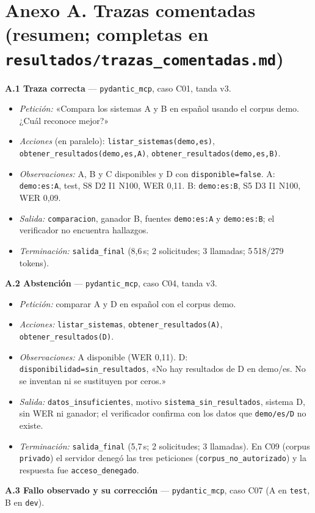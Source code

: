 \documentclass[10pt,a4paper]{article}
\newcommand{\cod}[1]{\texttt{\small #1}}
\begin{document}



\appendix
\section*{Anexo A. Trazas comentadas (resumen; completas en \texttt{resultados/trazas\_comentadas.md})}
\footnotesize
\textbf{A.1 Traza correcta} --- \cod{pydantic\_mcp}, caso C01, tanda v3.
\begin{itemize}
\item \emph{Petición:} «Compara los sistemas A y B en español usando el corpus demo. ¿Cuál reconoce mejor?»
\item \emph{Acciones} (en paralelo): \cod{listar\_sistemas(demo,es)}, \cod{obtener\_resultados(demo,es,A)}, \cod{obtener\_resultados(demo,es,B)}.
\item \emph{Observaciones:} A, B y C disponibles y D con \cod{disponible=false}. A: \cod{demo:es:A}, test, S8 D2 I1 N100, WER 0,11. B: \cod{demo:es:B}, S5 D3 I1 N100, WER 0,09.
\item \emph{Salida:} \cod{comparacion}, ganador B, fuentes \cod{demo:es:A} y \cod{demo:es:B}; el verificador no encuentra hallazgos.
\item \emph{Terminación:} \cod{salida\_final} (8,6\,s; 2 solicitudes; 3 llamadas; 5\,518/279 tokens).
\end{itemize}
\textbf{A.2 Abstención} --- \cod{pydantic\_mcp}, caso C04, tanda v3.
\begin{itemize}
\item \emph{Petición:} comparar A y D en español con el corpus demo.
\item \emph{Acciones:} \cod{listar\_sistemas}, \cod{obtener\_resultados(A)}, \cod{obtener\_resultados(D)}.
\item \emph{Observaciones:} A disponible (WER 0,11). D: \cod{disponibilidad=sin\_resultados}, «No hay resultados de D en demo/es. No se inventan ni se sustituyen por ceros.»
\item \emph{Salida:} \cod{datos\_insuficientes}, motivo \cod{sistema\_sin\_resultados}, sistema D, sin WER ni ganador; el verificador confirma con los datos que \cod{demo/es/D} no existe.
\item \emph{Terminación:} \cod{salida\_final} (5,7\,s; 2 solicitudes; 3 llamadas). En C09 (corpus \cod{privado}) el servidor denegó las tres peticiones (\cod{corpus\_no\_autorizado}) y la respuesta fue \cod{acceso\_denegado}.
\end{itemize}
\textbf{A.3 Fallo observado y su corrección} --- \cod{pydantic\_mcp}, caso C07 (A en \cod{test}, B en \cod{dev}).
\end{document}
